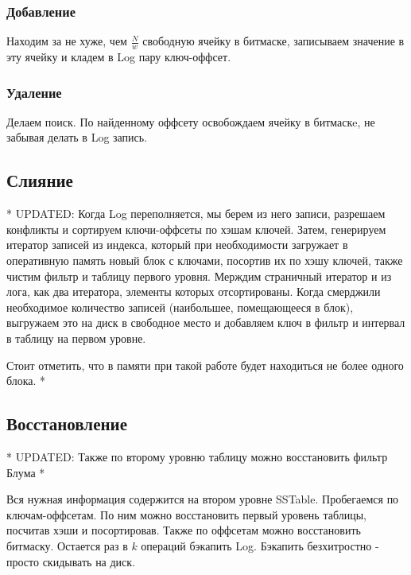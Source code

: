       \subsubsection*{Добавление}
        Находим за не хуже, чем $\frac{N}{w}$ свободную ячейку в битмаске, записываем значение в эту ячейку и кладем в Log пару ключ-оффсет.

      \subsubsection*{Удаление}
        Делаем поиск. По найденному оффсету освобождаем ячейку в битмаскe, не забывая делать в Log запись.

      \subsection*{Слияние}
        * UPDATED:
        Когда Log переполняется, мы берем из него записи, разрешаем конфликты и сортируем ключи-оффсеты по хэшам ключей. Затем, генерируем итератор записей из индекса, который при необходимости 
        загружает в оперативную память новый блок с ключами, посортив их по хэшу ключей, также чистим фильтр и таблицу первого уровня. 
        Мерждим страничный итератор и из лога, как два итератора, элементы которых отсортированы. 
        Когда смерджили необходимое количество записей (наибольшее, помещающееся в блок), выгружаем это на диск в свободное место и добавляем ключ в фильтр и интервал в таблицу на первом уровне. 
        
        Стоит отметить, что в памяти при такой работе будет находиться не более одного блока. 
        *
      \subsection*{Восстановление}
        * UPDATED: Также по второму уровню таблицу можно восстановить фильтр Блума *

        Вся нужная информация содержится на втором уровне SSTable. Пробегаемся по ключам-оффсетам. По ним можно восстановить первый уровень таблицы, посчитав хэши и посортировав. Также по оффсетам можно 
        восстановить битмаску. Остается раз в $k$ операций бэкапить Log. Бэкапить безхитростно - просто скидывать на диск.

